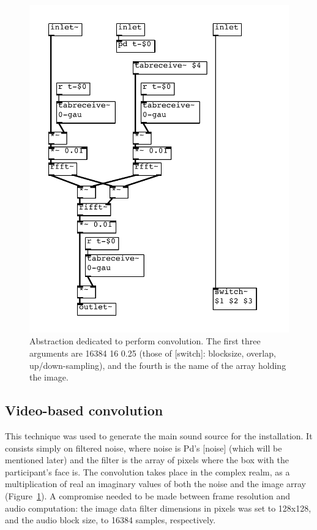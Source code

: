\documentclass{nime-alternate}
\begin{document}
\begin{figure}[htbp]
    \centering
        \includegraphics[width=1\columnwidth]{convolve}
    \caption{Abstraction dedicated to perform convolution. The first three arguments are 16384 16 0.25 (those of [switch\ttt]: blocksize, overlap, up/down-sampling), and the fourth is the name of the array holding the image.}
    \label{fig:convolve}
\end{figure}


\subsection{Video-based convolution}
This technique was used to generate the main sound source for the installation. It consists simply on filtered noise, where noise is Pd's [noise\ttt] (which will be mentioned later) and the filter is the array of pixels where the box with the participant's face is. The convolution takes place in the complex realm, as a multiplication of real an imaginary values of both the noise and the image array (Figure~\ref{fig:convolve}). A compromise needed to be made between frame resolution and audio computation: the image data filter dimensions in pixels was set to 128x128, and the audio block size, to 16384 samples, respectively. 
\end{document}

